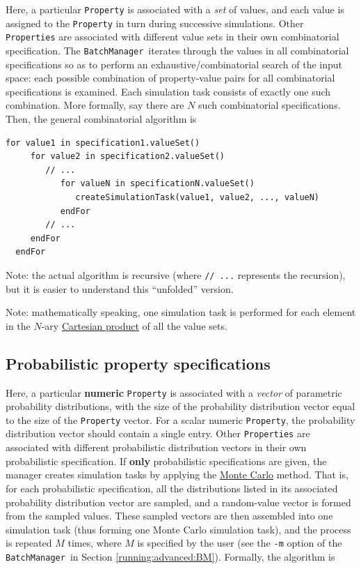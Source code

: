 \documentclass{article}
\newcommand{\BM}{{\tt BatchManager}}
\begin{document}
Here, a particular {\tt Property} is associated with a \textit{set} of values, and each value is assigned to the {\tt Property} in turn during successive simulations. Other {\tt Properties} are associated with different value sets in their own combinatorial specification. The \BM\ iterates through the values in all combinatorial specifications so as to perform an exhaustive/combinatorial search of the input space: each possible combination of property-value pairs for all combinatorial specifications is examined. Each simulation task consists of exactly one such combination. More formally, say there are $N$ such combinatorial specifications. Then, the general combinatorial algorithm is

\begin{lstlisting}[]
  for value1 in specification1.valueSet()
     for value2 in specification2.valueSet()
        // ...
           for valueN in specificationN.valueSet()
              createSimulationTask(value1, value2, ..., valueN)
           endFor
        // ...
     endFor
  endFor
\end{lstlisting}

\begin{sideblock}
Note: the actual algorithm is recursive (where {\tt // ...} represents the recursion), but it is easier to understand this ``unfolded'' version.
\end{sideblock}

\begin{sideblock}
Note: mathematically speaking, one simulation task is performed for each element in the $N$-ary \href{https://en.wikipedia.org/wiki/Cartesian_product}{Cartesian product} of all the value sets.
\end{sideblock}

\subsection{Probabilistic property specifications}
\label{psl:prob-spec}

Here, a particular \textbf{numeric} {\tt Property} is associated with a \textit{vector} of parametric probability distributions, with the size of the probability distribution vector equal to the size of the {\tt Property} vector. For a scalar numeric {\tt Property}, the probability distribution vector should contain a single entry. Other {\tt Properties} are associated with different probabilistic distribution vectors in their own probabilistic specification. If \textbf{only} probabilistic specifications are given, the manager creates simulation tasks by applying the \href{https://en.wikipedia.org/wiki/Monte_Carlo_method}{Monte Carlo} method. That is, for each probabilistic specification, all the distributions listed in its associated probability distribution vector are sampled, and a random-value vector is formed from the sampled values. These sampled vectors are then assembled into one simulation task (thus forming one Monte Carlo simulation task), and the process is repeated $M$ times, where $M$ is specified by the user (see the {\tt -m} option of the \BM\ in Section \ref{running:advanced:BM}). Formally, the algorithm is
\end{document}
